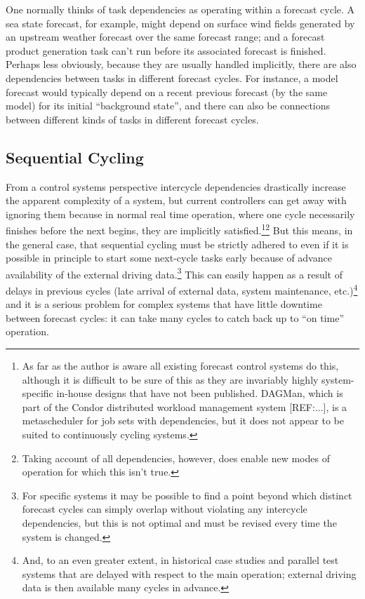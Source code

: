 \documentclass[11pt,a4paper]{article}
\begin{document}

One normally thinks of task dependencies as operating within a forecast
cycle. A sea state forecast, for example, might depend on surface wind
fields generated by an upstream weather forecast over the same forecast
range; and a forecast product generation task can't run before its
associated forecast is finished. Perhaps less obviously, because they
are usually handled implicitly, there are also dependencies between
tasks in different forecast cycles. For instance, a model forecast would
typically depend on a recent previous forecast (by the same model) for
its initial ``background state'', and there can also be connections
between different kinds of tasks in different forecast cycles. 

\subsection{Sequential Cycling}

From a control systems perspective intercycle dependencies drastically
increase the apparent complexity of a system, but current controllers
can get away with ignoring them because in normal real time operation,
where one cycle necessarily finishes before the next begins, they are
implicitly satisfied.\footnote{As far as the author is aware all
existing forecast control systems do this, although it is difficult to
be sure of this as they are invariably highly system-specific in-house
designs that have not been published. DAGMan, which is part of the
Condor distributed workload management system [REF:...], is a
metascheduler for job sets with dependencies, but it does not appear to
be suited to continuously cycling systems.}\footnote{Taking account of
all dependencies, however, does enable new modes of operation for which
this isn't true.}  But this means, in the general case, that sequential
cycling must be strictly adhered to even if it is possible in principle
to start some next-cycle tasks early because of advance availability of
the external driving data.\footnote{For specific systems it may be
possible to find a point beyond which distinct forecast cycles can
simply overlap without violating any intercycle dependencies, but this
is not optimal and must be revised every time the system is changed.}
This can easily happen as a result of delays in previous cycles (late
arrival of external data, system maintenance, etc.)\footnote{And, to an
even greater extent, in historical case studies and parallel test
systems that are delayed with respect to the main operation; external
driving data is then available many cycles in advance.} and it is a
serious problem for complex systems that have little downtime between
forecast cycles: it can take many cycles to catch back up to ``on time''
operation. 
\end{document}
